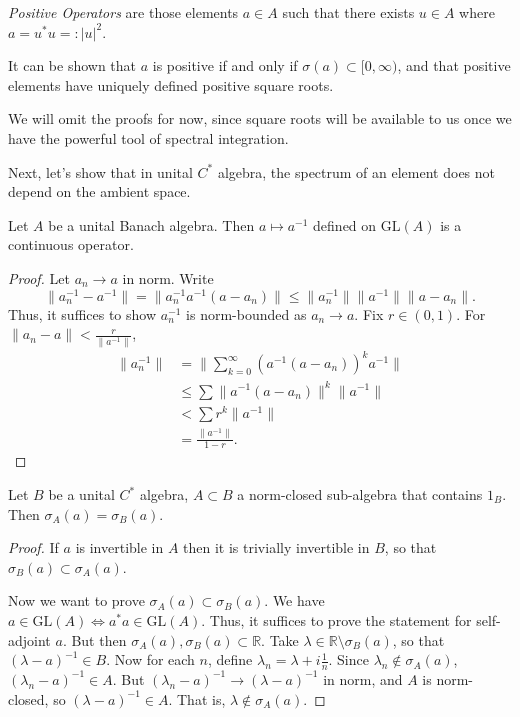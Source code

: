 \begin{remark}
\textit{Positive Operators} are those elements $a \in A$ such that there exists $u \in A$ where $a = u^* u =: |u|^2$.

It can be shown that $a$ is positive if and only if $\sigma(a) \subset [0,\infty )$, and that positive elements have uniquely defined positive square roots.

We will omit the proofs for now, since square roots will be available to us once we have the powerful tool of spectral integration.
\end{remark}

Next, let's show that in unital $C^*$ algebra, the spectrum of an element does not depend on the ambient space.

\begin{lemma}
	\label{lem:InverseContinuous}
	Let $A$ be a unital Banach algebra. Then $a \mapsto a^{-1}$ defined on $\text{GL}(A)$ is a continuous operator.
\end{lemma}
\begin{proof}
	Let $a_n \to a$ in norm.
	Write
	\[
		\|a_n^{-1} - a^{-1}\|
		= \|a_n^{-1} a^{-1} \left( a - a_n \right) \|
		\le \|a_n^{-1}\| \|a^{-1}\| \|a - a_n\|
	.\] 
	Thus, it suffices to show $a_n^{-1}$ is norm-bounded as $a_n \to a$. Fix $r \in (0,1)$. For $\|a_n - a\| < \frac{r}{\|a^{-1}\|}$,
	\begin{align*}
		\|a_n^{-1}\| &= \|\sum_{k=0}^{\infty} (a^{-1} (a - a_n))^k a^{-1}\| \\
		&\leq \sum \|a^{-1} (a - a_n)\|^k \|a^{-1}\| \\
		&< \sum r^k \|a^{-1}\| \\
		&= \frac{\|a^{-1}\|}{1 - r} 
	.\end{align*}
\end{proof}


\begin{proposition}
	\label{prop:SpectrumIndependent}
	Let $B$ be a unital $C^*$ algebra, $A \subset B$ a norm-closed sub-algebra that contains $1_B$. Then $\sigma_A(a) = \sigma_B(a)$.
\end{proposition}
\begin{proof}
	If $a$ is invertible in $A$ then it is trivially invertible in $B$, so that $\sigma_B(a) \subset \sigma_A(a)$.

	Now we want to prove $\sigma_A(a) \subset \sigma_B(a)$. We have $a \in \text{GL}(A) \iff a^* a \in \text{GL}(A)$. Thus, it suffices to prove the statement for self-adjoint $a$. But then $\sigma_A(a), \sigma_B(a) \subset \mathbb{R}$.
	Take $\lambda \in \mathbb{R} \setminus  \sigma_B(a)$, so that $(\lambda - a)^{-1} \in B$. Now for each $n$, define $\lambda_n = \lambda + i \frac{1}{n}$. Since  $\lambda_n \not\in \sigma_A(a)$, $(\lambda_n - a)^{-1} \in A$. But $(\lambda_n - a)^{-1} \to (\lambda - a)^{-1}$ in norm, and $A$ is norm-closed, so $(\lambda - a)^{-1} \in A$. That is, $\lambda \not\in \sigma_A(a)$.
\end{proof}

